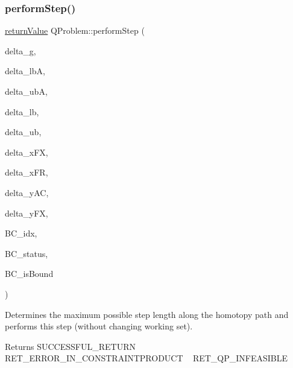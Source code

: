 \subsubsection{\texorpdfstring{perform\+Step()}{performStep()}}
{\footnotesize\ttfamily \hyperlink{_message_handling_8hpp_a81d556f613bfbabd0b1f9488c0fa865e}{return\+Value} Q\+Problem\+::perform\+Step (\begin{DoxyParamCaption}\item[{const \hyperlink{qp_o_a_s_e_s__wrapper_8h_a0d00e2b3dfadee81331bbb39068570c4}{real\+\_\+t} $\ast$const}]{delta\+\_\+g,  }\item[{const \hyperlink{qp_o_a_s_e_s__wrapper_8h_a0d00e2b3dfadee81331bbb39068570c4}{real\+\_\+t} $\ast$const}]{delta\+\_\+lbA,  }\item[{const \hyperlink{qp_o_a_s_e_s__wrapper_8h_a0d00e2b3dfadee81331bbb39068570c4}{real\+\_\+t} $\ast$const}]{delta\+\_\+ubA,  }\item[{const \hyperlink{qp_o_a_s_e_s__wrapper_8h_a0d00e2b3dfadee81331bbb39068570c4}{real\+\_\+t} $\ast$const}]{delta\+\_\+lb,  }\item[{const \hyperlink{qp_o_a_s_e_s__wrapper_8h_a0d00e2b3dfadee81331bbb39068570c4}{real\+\_\+t} $\ast$const}]{delta\+\_\+ub,  }\item[{const \hyperlink{qp_o_a_s_e_s__wrapper_8h_a0d00e2b3dfadee81331bbb39068570c4}{real\+\_\+t} $\ast$const}]{delta\+\_\+x\+FX,  }\item[{const \hyperlink{qp_o_a_s_e_s__wrapper_8h_a0d00e2b3dfadee81331bbb39068570c4}{real\+\_\+t} $\ast$const}]{delta\+\_\+x\+FR,  }\item[{const \hyperlink{qp_o_a_s_e_s__wrapper_8h_a0d00e2b3dfadee81331bbb39068570c4}{real\+\_\+t} $\ast$const}]{delta\+\_\+y\+AC,  }\item[{const \hyperlink{qp_o_a_s_e_s__wrapper_8h_a0d00e2b3dfadee81331bbb39068570c4}{real\+\_\+t} $\ast$const}]{delta\+\_\+y\+FX,  }\item[{\hyperlink{_types_8hpp_ab6fd6105e64ed14a0c9281326f05e623}{int\+\_\+t} \&}]{B\+C\+\_\+idx,  }\item[{\hyperlink{_types_8hpp_a70a6a40d261a015ead8d43aa589383a4}{Subject\+To\+Status} \&}]{B\+C\+\_\+status,  }\item[{\hyperlink{_types_8hpp_a20f82124c82b6f5686a7fce454ef9089}{Boolean\+Type} \&}]{B\+C\+\_\+is\+Bound }\end{DoxyParamCaption})\hspace{0.3cm}{\ttfamily [protected]}}

Determines the maximum possible step length along the homotopy path and performs this step (without changing working set). \begin{DoxyReturn}{Returns}
S\+U\+C\+C\+E\+S\+S\+F\+U\+L\+\_\+\+R\+E\+T\+U\+RN ~\newline
 R\+E\+T\+\_\+\+E\+R\+R\+O\+R\+\_\+\+I\+N\+\_\+\+C\+O\+N\+S\+T\+R\+A\+I\+N\+T\+P\+R\+O\+D\+U\+CT ~\newline
 R\+E\+T\+\_\+\+Q\+P\+\_\+\+I\+N\+F\+E\+A\+S\+I\+B\+LE 
\end{DoxyReturn}

